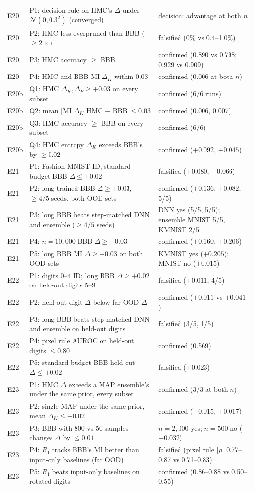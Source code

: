 \documentclass[11pt]{article}
\begin{document}
{\begin{longtable}{p{0.9cm}p{8.6cm}p{4.6cm}}
E20 & P1: decision rule on HMC's $\Delta$ under $\mathcal N(0,0.3^2)$ (converged) & decision: advantage at both $n$ \\
E20 & P2: HMC less overpruned than BBB ($\ge2\times$) & falsified (0\% vs 0.4--1.0\%) \\
E20 & P3: HMC accuracy $\ge$ BBB & confirmed (0.890 vs 0.798; 0.929 vs 0.909) \\
E20 & P4: HMC and BBB MI $\Delta_K$ within 0.03 & confirmed (0.006 at both $n$) \\
E20b & Q1: HMC $\Delta_K,\Delta_F\ge+0.03$ on every subset & confirmed (6/6 runs) \\
E20b & Q2: mean $|$MI $\Delta_K$ HMC $-$ BBB$|\le0.03$ & confirmed (0.006, 0.007) \\
E20b & Q3: HMC accuracy $\ge$ BBB on every subset & confirmed (6/6) \\
E20b & Q4: HMC entropy $\Delta_K$ exceeds BBB's by $\ge0.02$ & confirmed ($+0.092$, $+0.045$) \\
E21 & P1: Fashion-MNIST ID, standard-budget BBB $\Delta\le+0.02$ & falsified ($+0.080$, $+0.066$) \\
E21 & P2: long-trained BBB $\Delta\ge+0.03$, $\ge4/5$ seeds, both OOD sets & confirmed ($+0.136$, $+0.082$; 5/5) \\
E21 & P3: long BBB beats step-matched DNN and ensemble ($\ge4/5$ seeds) & DNN yes (5/5, 5/5); ensemble MNIST 5/5, KMNIST 2/5 \\
E21 & P4: $n=10{,}000$ BBB $\Delta\ge+0.03$ & confirmed ($+0.160$, $+0.206$) \\
E21 & P5: long BBB MI $\Delta\ge+0.03$ on both OOD sets & KMNIST yes ($+0.205$); MNIST no ($+0.015$) \\
E22 & P1: digits 0--4 ID; long BBB $\Delta\ge+0.02$ on held-out digits 5--9 & falsified ($+0.011$, 4/5) \\
E22 & P2: held-out-digit $\Delta$ below far-OOD $\Delta$ & confirmed ($+0.011$ vs $+0.041$) \\
E22 & P3: long BBB beats step-matched DNN and ensemble on held-out digits & falsified (3/5, 1/5) \\
E22 & P4: pixel rule AUROC on held-out digits $\le0.80$ & confirmed (0.569) \\
E22 & P5: standard-budget BBB held-out $\Delta\le+0.02$ & falsified ($+0.023$) \\
E23 & P1: HMC $\Delta$ exceeds a MAP ensemble's under the same prior, every subset & confirmed (3/3 at both $n$) \\
E23 & P2: single MAP under the same prior, mean $\Delta_K\le+0.02$ & confirmed ($-0.015$, $+0.017$) \\
E23 & P3: BBB with 800 vs 50 samples changes $\Delta$ by $\le0.01$ & $n=2{,}000$ yes; $n=500$ no ($+0.032$) \\
E23 & P4: $R_1$ tracks BBB's MI better than input-only baselines (far OOD) & falsified (pixel rule $|\rho|$ 0.77--0.87 vs 0.71--0.83) \\
E23 & P5: $R_1$ beats input-only baselines on rotated digits & confirmed (0.86--0.88 vs 0.50--0.55) \\
\end{longtable}
}



\end{document}
